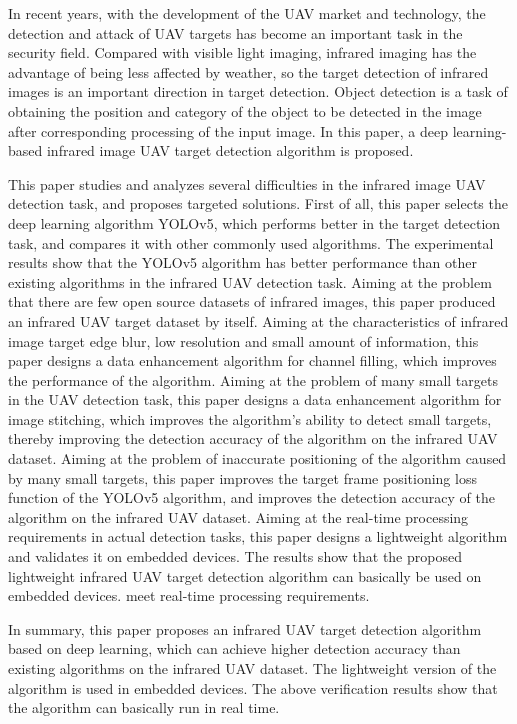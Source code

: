 \begin{eabstract}
  In recent years, with the development of the UAV market and technology, the detection and attack of UAV targets has become an important task in the security field. Compared with visible light imaging, infrared imaging has the advantage of being less affected by weather, so the target detection of infrared images is an important direction in target detection. Object detection is a task of obtaining the position and category of the object to be detected in the image after corresponding processing of the input image. In this paper, a deep learning-based infrared image UAV target detection algorithm is proposed.

  This paper studies and analyzes several difficulties in the infrared image UAV detection task, and proposes targeted solutions. First of all, this paper selects the deep learning algorithm YOLOv5, which performs better in the target detection task, and compares it with other commonly used algorithms. The experimental results show that the YOLOv5 algorithm has better performance than other existing algorithms in the infrared UAV detection task. Aiming at the problem that there are few open source datasets of infrared images, this paper produced an infrared UAV target dataset by itself. Aiming at the characteristics of infrared image target edge blur, low resolution and small amount of information, this paper designs a data enhancement algorithm for channel filling, which improves the performance of the algorithm. Aiming at the problem of many small targets in the UAV detection task, this paper designs a data enhancement algorithm for image stitching, which improves the algorithm's ability to detect small targets, thereby improving the detection accuracy of the algorithm on the infrared UAV dataset. Aiming at the problem of inaccurate positioning of the algorithm caused by many small targets, this paper improves the target frame positioning loss function of the YOLOv5 algorithm, and improves the detection accuracy of the algorithm on the infrared UAV dataset. Aiming at the real-time processing requirements in actual detection tasks, this paper designs a lightweight algorithm and validates it on embedded devices. The results show that the proposed lightweight infrared UAV target detection algorithm can basically be used on embedded devices. meet real-time processing requirements.
  
  In summary, this paper proposes an infrared UAV target detection algorithm based on deep learning, which can achieve higher detection accuracy than existing algorithms on the infrared UAV dataset. The lightweight version of the algorithm is used in embedded devices. The above verification results show that the algorithm can basically run in real time.
\end{eabstract}
